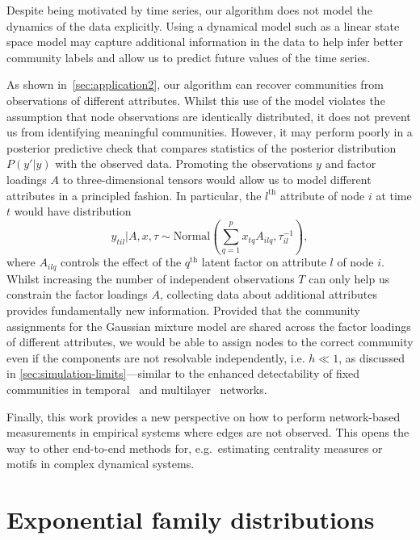 \documentclass[onecolumn,pre,superscriptaddress, longbibliography, nofootinbib, notitlepage]{revtex4-1}
\newcommand{\dist}{\sim}
\newcommand{\normal}{\mathrm{Normal}}
\begin{document}
Despite being motivated by time series, our algorithm does not model the dynamics of the data explicitly. Using a dynamical model such as a linear state space model may capture additional information in the data to help infer better community labels and allow us to predict future values of the time series. 

As shown in~\cref{sec:application2}, our algorithm can recover communities from observations of different attributes. Whilst this use of the model violates the assumption that node observations are identically distributed, it does not prevent us from identifying meaningful communities. However, it may perform poorly in a posterior predictive check that compares statistics of the posterior distribution $P(y'|y)$ with the observed data. 
Promoting the observations $y$ and factor loadings $A$ to three-dimensional tensors would allow us to model different attributes in a principled fashion. In particular, the $l^\mathrm{th}$ attribute of node $i$ at time $t$ would have distribution
\[
	y_{til} | A, x, \tau \dist \normal\left(\sum_{q=1}^p x_{tq} A_{ilq}, \tau_{il}^{-1}\right),
\]
where $A_{ilq}$ controls the effect of the $q^\mathrm{th}$ latent factor on attribute $l$ of node $i$. Whilst increasing the number of independent observations $T$ can only help us constrain the factor loadings $A$, collecting data about additional attributes provides fundamentally new information. Provided that the community assignments for the Gaussian mixture model are shared across the factor loadings of different attributes, we would be able to assign nodes to the correct community even if the components are not resolvable independently, i.e. $h\ll 1$, as discussed in \cref{sec:simulation-limits}---similar to the enhanced detectability of fixed communities in temporal~\cite{ghasemian2016detectability} and multilayer~\cite{taylor2016enhanced} networks.

Finally, this work provides a new perspective on how to perform network-based measurements in empirical systems where edges are not observed. This opens the way to other end-to-end methods for, e.g.\ estimating centrality measures or motifs in complex dynamical systems.




\appendix

\section{\label{app:distributions} Exponential family distributions}
\end{document}
